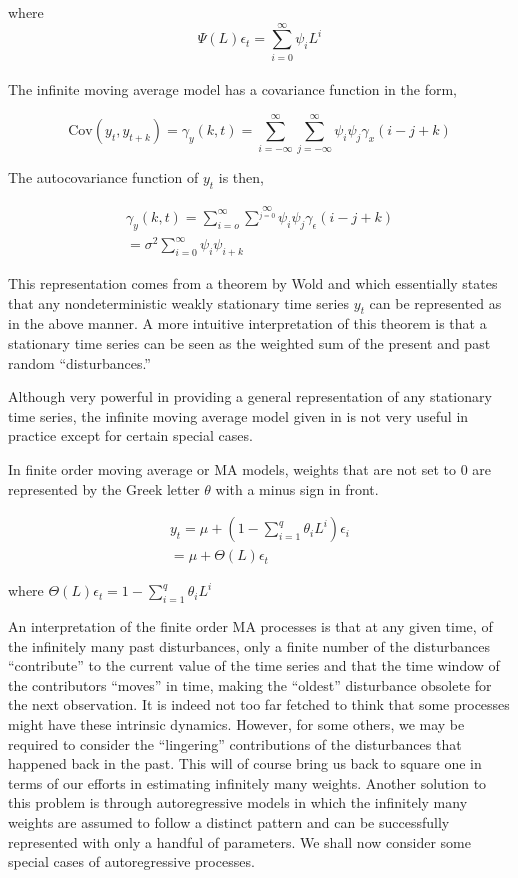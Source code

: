 \documentclass[
  11pt,
]{article}
\begin{document}
where \[
  \Psi(L)\epsilon_{t} = \sum\limits_{i=0}^{\infty}\psi_{i}L^{i}
  \]\\
The infinite moving average model has a covariance function in the form,

\[
\mathrm{Cov}(y_{t}, y_{t+k}) = \gamma_{y}(k, t) = \sum\limits_{i = -\infty}^{\infty}\sum\limits_{j = - \infty}^{\infty}\psi_{i}\psi_{j}\gamma_{x}(i - j + k)
\]

The autocovariance function of \(y_{t}\) is then,

\begin{gather*}
\gamma_{y}(k, t) = \sum\limits_{i = o}^{\infty}\sum^{\infty}\limits_{j = 0} \psi_{i}\psi_{j}\gamma_{\epsilon}(i-j+k) \\[8pt]
= \sigma^{2}\sum\limits_{i = 0}^{\infty}\psi_{i}\psi_{i + k}
\end{gather*}

This representation comes from a theorem by Wold and which essentially
states that any nondeterministic weakly stationary time series \(y_{t}\)
can be represented as in the above manner. A more intuitive
interpretation of this theorem is that a stationary time series can be
seen as the weighted sum of the present and past random
``disturbances.''

Although very powerful in providing a general representation of any
stationary time series, the infinite moving average model given in is
not very useful in practice except for certain special cases.

In finite order moving average or MA models, weights that are not set to
0 are represented by the Greek letter \(\theta\) with a minus sign in
front.

\begin{gather*}
y_{t} = \mu + \left(1 - \sum\limits_{i=1}^{q}\theta_{i}L^{i} \right)\epsilon_{i}\\[8pt]
= \mu + \Theta(L)\epsilon_{t}
\end{gather*}

where
\(\Theta(L)\epsilon_{t} = 1 - \sum\limits_{i=1}^{q}\theta_{i}L^{i}\)

An interpretation of the finite order MA processes is that at any given
time, of the infinitely many past disturbances, only a finite number of
the disturbances ``contribute'' to the current value of the time series
and that the time window of the contributors ``moves'' in time, making
the ``oldest'' disturbance obsolete for the next observation. It is
indeed not too far fetched to think that some processes might have these
intrinsic dynamics. However, for some others, we may be required to
consider the ``lingering'' contributions of the disturbances that
happened back in the past. This will of course bring us back to square
one in terms of our efforts in estimating infinitely many weights.
Another solution to this problem is through autoregressive models in
which the infinitely many weights are assumed to follow a distinct
pattern and can be successfully represented with only a handful of
parameters. We shall now consider some special cases of autoregressive
processes.
\end{document}
